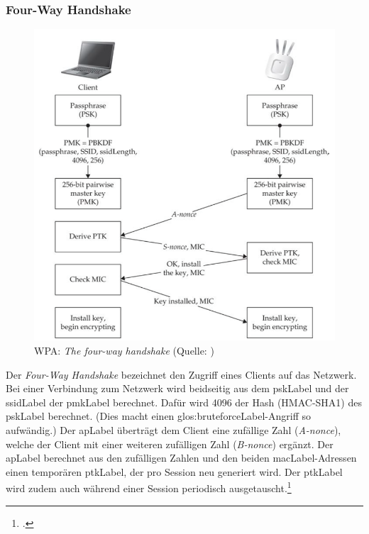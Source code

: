 \subsubsection{Four-Way Handshake}
\begin{figure}[H]
	\centering
	\includegraphics[width=0.8\linewidth]{images/wpa/four-way-handshake.png}
	\caption[WPA: The four-way handshake]{WPA: \textit{The four-way handshake} (Quelle: \cite[][151]{WrightCache201503})}
\end{figure}
Der \textit{Four-Way Handshake} bezeichnet den Zugriff eines Clients auf das Netzwerk.
Bei einer Verbindung zum Netzwerk wird beidseitig aus dem \gls{pskLabel} und der \gls{ssidLabel} der \gls{pmkLabel} berechnet.
Dafür wird 4096 der Hash (HMAC-SHA1) des \gls{pskLabel} berechnet. (Dies macht einen \gls{glos:bruteforceLabel}-Angriff so aufwändig.)
Der \gls{apLabel} überträgt dem Client eine zufällige Zahl (\textit{A-nonce}), welche der Client mit einer weiteren zufälligen Zahl (\textit{B-nonce}) ergänzt.
Der \gls{apLabel} berechnet aus den zufälligen Zahlen und den beiden \gls{macLabel}-Adressen einen temporären \gls{ptkLabel}, der pro Session neu generiert wird. Der \gls{ptkLabel} wird zudem auch während einer Session periodisch ausgetauscht.\footcite[][40f.]{WrightCache201503}

